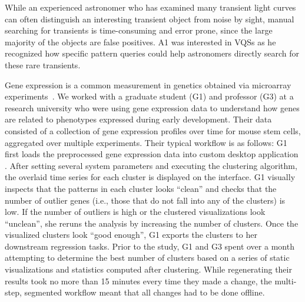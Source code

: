 \npar While an experienced astronomer who has examined many transient light curves can often distinguish an interesting transient object from noise by sight, manual searching for transients is time-consuming and error prone, since the large majority of the objects are false positives. A1 was interested in VQSs as he recognized how specific pattern queries could help astronomers directly search for these rare transients.
\par\noindent{} Gene expression is a common measurement in genetics obtained via microarray experiments~\cite{Peng2016}.  We worked with a graduate student (G1) and professor (G3) at a research university who were using gene expression data to understand how genes are related to phenotypes expressed during early  development. Their data consisted of a collection of gene expression profiles over time for mouse stem cells, aggregated over multiple experiments. %
\npar Their typical workflow is as follows: G1 first loads the preprocessed gene expression data into custom desktop application . After setting several system parameters and executing the clustering algorithm, the overlaid time series for each cluster is displayed on the interface. G1 visually inspects that the patterns in each cluster looks ``clean'' and checks that the number of outlier genes (i.e., those that do not fall into any of the clusters) is low.  If the number of outliers is high or the clustered visualizations look ``unclean'', she reruns the analysis by increasing the number of clusters. Once the visualized clusters look ``good enough'', G1 exports the clusters to her downstream regression tasks.
\npar Prior to the study, G1 and G3 spent over a month attempting to determine the best number of clusters based on a series of static visualizations and statistics computed after clustering. While regenerating their results took no more than 15 minutes every time they made a change, the multi-step, segmented workflow meant that all changes had to be done offline. 
